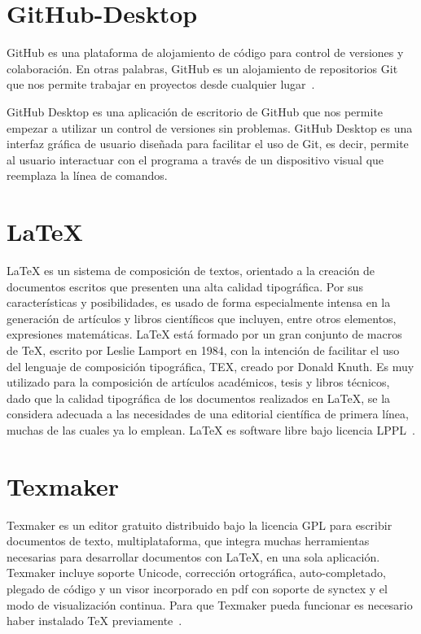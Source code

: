 \section{GitHub-Desktop}
GitHub es una plataforma de alojamiento de código para control de versiones y colaboración. En otras palabras, GitHub es un alojamiento de repositorios Git que nos permite trabajar en proyectos desde cualquier lugar~\cite{gitHub}.

GitHub Desktop es una aplicación de escritorio de GitHub que nos permite empezar a utilizar un control de versiones sin problemas. GitHub Desktop es una interfaz gráfica de usuario diseñada para facilitar el uso de Git, es decir, permite al usuario interactuar con el programa a través de un dispositivo visual que reemplaza la línea de comandos.

\section{LaTeX}
LaTeX es un sistema de composición de textos, orientado a la creación de documentos escritos que presenten una alta calidad tipográfica. Por sus características y posibilidades, es usado de forma especialmente intensa en la generación de artículos y libros científicos que incluyen, entre otros elementos, expresiones matemáticas.
LaTeX está formado por un gran conjunto de macros de TeX, escrito por Leslie Lamport en 1984, con la intención de facilitar el uso del lenguaje de composición tipográfica, TEX, creado por Donald Knuth. Es muy utilizado para la composición de artículos académicos, tesis y libros técnicos, dado que la calidad tipográfica de los documentos realizados en LaTeX, se la considera adecuada a las necesidades de una editorial científica de primera línea, muchas de las cuales ya lo emplean.
LaTeX es software libre bajo licencia LPPL~\cite{wiki:latex}.

\section{Texmaker}
Texmaker es un editor gratuito distribuido bajo la licencia GPL para escribir documentos de texto, multiplataforma, que integra muchas herramientas necesarias para desarrollar documentos con LaTeX, en una sola aplicación. Texmaker incluye soporte Unicode, corrección ortográfica, auto-completado, plegado de código y un visor incorporado en pdf con soporte de synctex y el modo de visualización continua.
Para que Texmaker pueda funcionar es necesario haber instalado TeX previamente~\cite{wiki:texmaker}.

